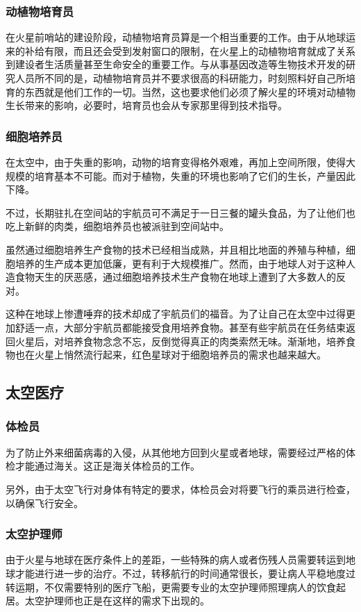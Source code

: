 \documentclass[letterpaper,10pt]{sphinxmanual}
\begin{document}
\subsubsection{动植物培育员}
\label{profession:id20}
在火星前哨站的建设阶段，动植物培育员算是一个相当重要的工作。由于从地球运来的补给有限，而且还会受到发射窗口的限制，在火星上的动植物培育就成了关系到建设者生活质量甚至生命安全的重要工作。与从事基因改造等生物技术开发的研究人员所不同的是，动植物培育员并不要求很高的科研能力，时刻照料好自己所培育的东西就是他们工作的一切。当然，这也要求他们必须了解火星的环境对动植物生长带来的影响，必要时，培育员也会从专家那里得到技术指导。


\subsubsection{细胞培养员}
\label{profession:id21}
在太空中，由于失重的影响，动物的培育变得格外艰难，再加上空间所限，使得大规模的培育基本不可能。而对于植物，失重的环境也影响了它们的生长，产量因此下降。

不过，长期驻扎在空间站的宇航员可不满足于一日三餐的罐头食品，为了让他们也吃上新鲜的肉类，细胞培养员也被派驻到空间站中。

虽然通过细胞培养生产食物的技术已经相当成熟，并且相比地面的养殖与种植，细胞培养的生产成本更加低廉，更有利于大规模推广。然而，由于地球人对于这种人造食物天生的厌恶感，通过细胞培养技术生产食物在地球上遭到了大多数人的反对。

这种在地球上惨遭唾弃的技术却成了宇航员们的福音。为了让自己在太空中过得更加舒适一点，大部分宇航员都能接受食用培养食物。甚至有些宇航员在任务结束返回火星后，对培养食物念念不忘，反倒觉得真正的肉类索然无味。渐渐地，培养食物也在火星上悄然流行起来，红色星球对于细胞培养员的需求也越来越大。


\subsection{太空医疗}
\label{profession:id22}

\subsubsection{体检员}
\label{profession:id23}
为了防止外来细菌病毒的入侵，从其他地方回到火星或者地球，需要经过严格的体检才能通过海关。这正是海关体检员的工作。

另外，由于太空飞行对身体有特定的要求，体检员会对将要飞行的乘员进行检查，以确保飞行安全。


\subsubsection{太空护理师}
\label{profession:id24}
由于火星与地球在医疗条件上的差距，一些特殊的病人或者伤残人员需要转运到地球才能进行进一步的治疗。不过，转移航行的时间通常很长，要让病人平稳地度过转运期，不仅需要特别的医疗飞船，更需要专业的太空护理师照理病人的饮食起居。太空护理师也正是在这样的需求下出现的。
\end{document}
